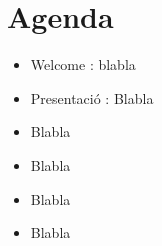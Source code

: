 \section{Agenda}

\begin{itemize}
\item Welcome : blabla
\item Presentació : Blabla
\item Blabla
\item Blabla
\item Blabla
\item Blabla

\end{itemize}
